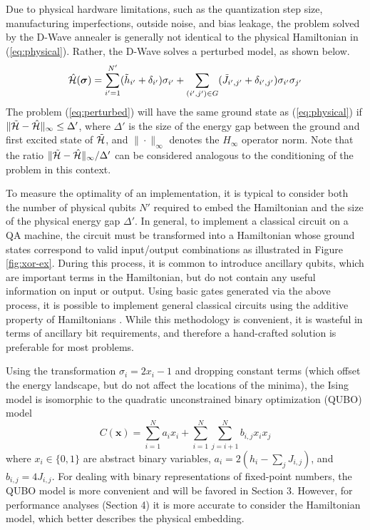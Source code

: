 Due to physical hardware limitations, such as the quantization step size, manufacturing imperfections, outside noise, and bias leakage, the problem solved by the D-Wave annealer is generally not identical to the physical Hamiltonian in (\ref{eq:physical}).
Rather, the D-Wave solves a perturbed model, as shown below.
\begin{equation}
\hat{\mathcal{H}}(\text{\boldmath$\sigma$}) = \sum_{i'=1}^{N'} (\Tilde{h}_{i'} + \delta_{i'})\sigma_{i'} + \sum_{(i',j')\in G} (\Tilde{J}_{i',j'} + \delta_{i',j'}) \sigma_{i'} \sigma_{j'}
\label{eq:perturbed}
\end{equation}
The problem (\ref{eq:perturbed}) will have the same ground state as (\ref{eq:physical}) if $\|\Tilde{\mathcal{H}} - \hat{\mathcal{H}}\|_\infty \leq \Delta'$, where $\Delta'$ is the size of the energy gap between the ground and first excited state of $\Tilde{\mathcal{H}}$, and $\|\cdot\|_\infty$ denotes the $H_\infty$ operator norm.
Note that the ratio $\|\Tilde{\mathcal{H}} - \hat{\mathcal{H}}\|_\infty/\Delta'$ can be considered analogous to the conditioning of the problem in this context.



To measure the optimality of an implementation, it is typical to consider both the number of physical qubits $N'$ required to embed the Hamiltonian and the size of the physical energy gap $\Delta'$.
In general, to implement a classical circuit on a QA machine, the circuit must be transformed into a Hamiltonian whose ground states correspond to valid input/output combinations as illustrated in Figure \ref{fig:xor-ex}.
During this process, it is common to introduce ancillary qubits, which are important terms in the Hamiltonian, but do not contain any useful information on input or output.
Using basic gates generated via the above process, it is possible to implement general classical circuits using the additive property of Hamiltonians \cite{pakin2018performing}.
While this methodology is convenient, it is wasteful in terms of ancillary bit requirements, and therefore a hand-crafted solution is preferable for most problems.



Using the transformation $\sigma_i = 2x_i - 1$ and dropping constant terms (which offset the energy landscape, but do not affect the locations of the minima), the Ising model is isomorphic to the quadratic unconstrained binary optimization (QUBO) model
\begin{equation}
C(\mathbf{x}) = \sum_{i=1}^N a_i x_i + \sum_{i=1}^N \sum_{j=i+1}^N b_{i,j} x_i x_j
\label{eq:QUBO}
\end{equation}
where $x_i\in\{0,1\}$ are abstract binary variables, $a_i = 2\left(h_i-\sum_j J_{i,j}\right)$, and $b_{i,j} = 4J_{i,j}$.
For dealing with binary representations of fixed-point numbers, the QUBO model is more convenient and will be favored in Section 3.
However, for performance analyses (Section 4) it is more accurate to consider the Hamiltonian model, which better describes the physical embedding.

